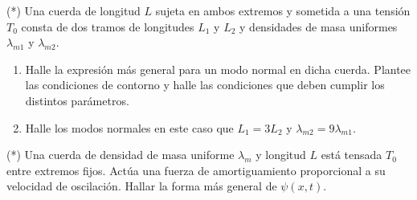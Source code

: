\item (*) Una cuerda de longitud $L$ sujeta en ambos extremos y sometida a una tensión $T_{0}$ consta de dos tramos de longitudes $L_1$ y $L_2$ y densidades de masa uniformes $\lambda_{m1}$ y $\lambda_{m2}$.
\begin{enumerate}
	\item Halle la expresión más general para un modo normal en dicha cuerda.
	Plantee las condiciones de contorno y halle las condiciones que deben cumplir los distintos parámetros.
	\item Halle los modos normales en este caso que $L_1 = 3 L_2$ y $\lambda_{m2} = 9 \lambda_{m1}$. 
\end{enumerate}


\item (*) Una cuerda de densidad de masa uniforme $\lambda_m$ y longitud $L$ está tensada $T_0$ entre extremos fijos.
Actúa una fuerza de amortiguamiento proporcional a su velocidad de oscilación.
Hallar la forma más general de $\psi(x,t)$.



